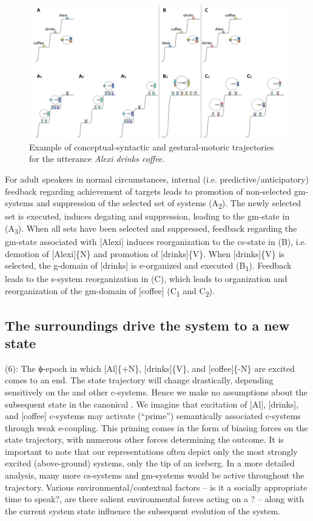   
\begin{figure}
\includegraphics[width=\textwidth]{figures/Tilsen-img55.png}
\caption{Example of conceptual-syntactic and gestural-motoric trajectories for the utterance \textit{Alexi drinks coffee}.}
\label{fig:4:5}
\end{figure}
 

For adult speakers in normal circumstances, internal (i.e. predictive/anticipatory) feedback regarding achievement of  targets leads to promotion of non-selected gm-systems and suppression of the selected set of systems (A\textsubscript{2}). The newly selected set is executed,  induces degating and suppression, leading to the gm-state in (A\textsubscript{3}). When all sets have been selected and suppressed, feedback regarding the gm-state associated with [Alexi] induces reorganization to the cs-state in (B), i.e. demotion of [Alexi]\{N\} and promotion of [drinks]\{V\}. When [drinks]\{V\} is selected, the g-domain of [drinks] is e-organized and executed (B\textsubscript{1}). Feedback leads to the s-system reorganization in (C), which leads to organization and reorganization of the gm-domain of [coffee] (C\textsubscript{1} and C\textsubscript{2}).

\subsection{The surroundings drive the system to a new state}

(6): The ϕ-epoch in which [Al]\{+N\}, [drinks]\{V\}, and [coffee]\{-N\} are excited comes to an end. The state trajectory will change drastically, depending sensitively on the  and other c-systems. Hence we make no assumptions about the subsequent state in the canonical . We imagine that excitation of [Al], [drinks], and [coffee] c-systems may activate (“prime”) semantically associated c-systems through weak e-coupling. This priming comes in the form of biasing forces on the state trajectory, with numerous other  forces determining the outcome. It is important to note that our representations often depict only the most strongly excited (above-ground) systems, only the tip of an iceberg. In a more detailed analysis, many more cs-systems and gm-systems would be active throughout the trajectory. Various environmental/contextual factors -- is it a socially appropriate time to speak?, are there salient environmental forces acting on a ? -- along with the current system state influence the subsequent evolution of the system. 

